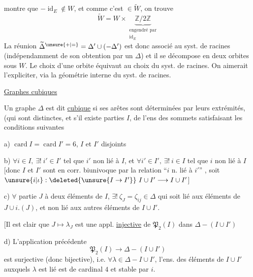   montre que $-\operatorname{id}_E\notin W$, et comme c'est $\in\widetilde W$, on trouve
\[
\widetilde W=W\times\underbrace{\mathbb Z/2\mathbb Z}_{\substack{\text{engendré par}\\\operatorname{id}_E}}
\]
\deleted{\unsure{$\Delta$}} La réunion $\widetilde\Delta^{\unsure{+|=}}=\Delta'\cup(-\Delta')$ est donc   associé au syst. de racines (indépendamment de son obtention par un $\Delta$) et il se décompose en deux orbites sous $W$. Le choix d'une orbite équivaut au choix du syst. de racines. On aimerait l'expliciter,  via la géométrie interne du syst. de racines.

\uline{Graphes cubiques}

Un graphe $\Delta$ est dit  \uline{cubique} si  ses arêtes sont déterminées par leurs extrémités, (qui sont distinctes, et s'il existe  parties $I$,  de l'ens des sommets satisfaisant les conditions suivantes

a)  $\operatorname{card} I=\operatorname{card} I'=6$, $I$ et $I'$ disjoints

b) $\forall i\in I,\ \exists!\ i'\in I'$ tel que $i'$ non lié à $I$, et $\forall i'\in I',\ \exists!\ i\in I$ tel que $i$ non lié à $I$ [donc $I$ et $I'$ sont en corr. biunivoque par la relation ``$i$ n. lié à $i'$'' , soit $\unsure{i|\iota}:\deleted{\unsure{I\to I'}}\ I\cup I'\longrightarrow I\cup I'$] 

c) $\forall$ partie $J$  à deux éléments de $I$, $\exists!\ \zeta_J=\zeta_{ij}\in\Delta$  qui soit lié aux  éléments  de $J\cup i.(J)$, et non lié aux autres éléments de $I\cup I'$.

\deleted{[\unsure{donc c'est donc que} $\lambda_J\notin I\cup I'$}

[Il est clair que $J\longmapsto\lambda_J$ est une appl. \uline{injective} de $\mathfrak P_2(I)$ dans $\Delta-(I\cup I')$

d) L'application précédente
\[
\mathfrak P_2(I)\longrightarrow\Delta-(I\cup I')
\]
est  surjective (donc bijective), i.e. $\forall\lambda\in\Delta-I\cup I'$,  l'ens. des éléments de $I\cup I'$ auxquels $\lambda$ est lié est de cardinal $4$ et stable par $i$.

